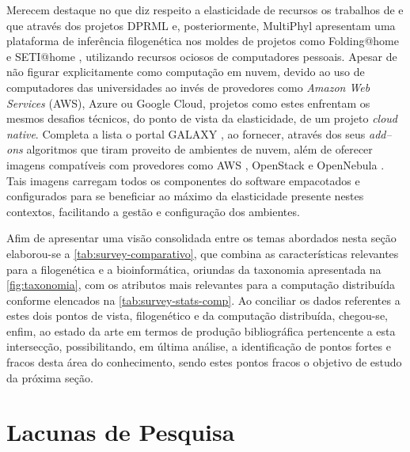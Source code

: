\documentclass[english,brazilian]{UNISINOSmonografia} %
\newcommand\defaultFigureWidth{0.9}
\begin{document}
Merecem destaque no que diz respeito a elasticidade de recursos os trabalhos de  e  que através dos projetos DPRML e, posteriormente, MultiPhyl apresentam uma plataforma de inferência filogenética nos moldes de projetos como Folding@home \cite{Shirts2000,Larson2002} e SETI@home \cite{Korpela2001}, utilizando recursos ociosos de computadores pessoais.
Apesar de não figurar explicitamente como computação em nuvem, devido ao uso de computadores das universidades ao invés de provedores como \textit{Amazon Web Services} (AWS), Azure ou Google Cloud, projetos como estes enfrentam os mesmos desafios técnicos, do ponto de vista da elasticidade, de um projeto \textit{cloud native}.
Completa a lista o portal GALAXY \cite{Afgan2016}, ao fornecer, através dos seus \textit{add--ons} algoritmos que tiram proveito de ambientes de nuvem, além de oferecer imagens compatíveis com provedores como AWS \cite{Varia2017}, OpenStack \cite{Sefraoui2012} e OpenNebula \cite{Milojicic2011}.
Tais imagens carregam todos os componentes do software empacotados e configurados para se beneficiar ao máximo da elasticidade presente nestes contextos, facilitando a gestão e configuração dos ambientes.


Afim de apresentar uma visão consolidada entre os temas abordados nesta seção elaborou-se a \autoref{tab:survey-comparativo}, que combina as características relevantes para a filogenética e a bioinformática, oriundas da taxonomia apresentada na \autoref{fig:taxonomia}, com os atributos mais relevantes para a computação distribuída conforme elencados na \autoref{tab:survey-stats-comp}.
Ao conciliar os dados referentes a estes dois pontos de vista, filogenético e da computação distribuída, chegou-se, enfim, ao estado da arte em termos de produção bibliográfica pertencente a esta intersecção, possibilitando, em última análise, a identificação de pontos fortes e fracos desta área do conhecimento, sendo estes pontos fracos o objetivo de estudo da próxima seção.




\section{Lacunas de Pesquisa}
\label{sec:lacunas-de-pesquisa}


\end{document}
